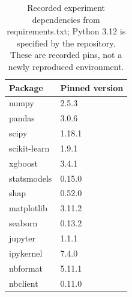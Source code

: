 \begin{table}[H]\centering\small
\caption{Recorded experiment dependencies from requirements.txt; Python 3.12 is specified by the repository. These are recorded pins, not a newly reproduced environment.}\label{tab:dependencies}
\setlength{\tabcolsep}{4pt}
\begin{tabular}{ll}
\toprule
Package & Pinned version \\
\midrule
numpy & 2.5.3 \\
pandas & 3.0.6 \\
scipy & 1.18.1 \\
scikit-learn & 1.9.1 \\
xgboost & 3.4.1 \\
statsmodels & 0.15.0 \\
shap & 0.52.0 \\
matplotlib & 3.11.2 \\
seaborn & 0.13.2 \\
jupyter & 1.1.1 \\
ipykernel & 7.4.0 \\
nbformat & 5.11.1 \\
nbclient & 0.11.0 \\
\bottomrule\end{tabular}
\end{table}
